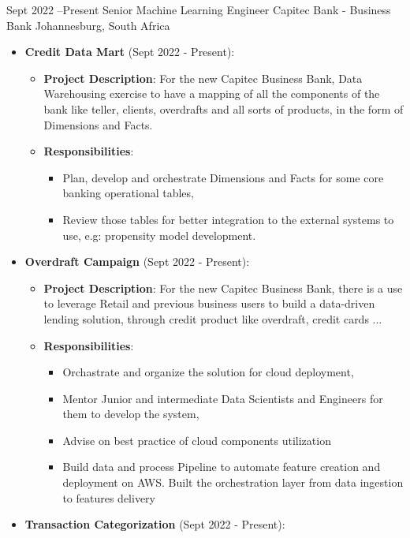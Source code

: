 \documentclass[11pt, letterpaper]{moderncv}        %
\begin{document}
\cventry
{Sept 2022 --Present}
{Senior Machine Learning Engineer}
{Capitec Bank - Business Bank}
{Johannesburg, South Africa}
{}
{
		\begin{itemize}
			\item \textbf{Credit Data Mart} (Sept 2022 - Present):  
			\begin{itemize}%
				\item \textbf{Project Description}: For the new Capitec Business Bank, Data Warehousing exercise to have a mapping of all the components of the bank like teller, clients, overdrafts and all sorts of products, in the form of Dimensions and Facts. 
			\item \textbf{Responsibilities}:
			\begin{itemize}
				\item Plan, develop and orchestrate Dimensions and Facts for some core banking operational tables,
				\item Review those tables for better integration to the external systems to use, e.g: propensity model development.
			\end{itemize}
		\end{itemize}
		\item \textbf{Overdraft Campaign} (Sept 2022 - Present):  
		\begin{itemize}%
			\item \textbf{Project Description}: For the new Capitec Business Bank, there is a use to leverage Retail and previous business users to build a data-driven lending solution, through credit product like overdraft, credit cards ...
			\item \textbf{Responsibilities}:
				\begin{itemize}
					\item Orchastrate and organize the solution for cloud deployment,
					\item Mentor Junior and intermediate Data Scientists and Engineers for them to develop the system,
					\item Advise on best practice of cloud components utilization
					\item Build data and process Pipeline to automate feature creation and deployment on AWS. Built the orchestration layer from data ingestion to features delivery
				\end{itemize}
		\end{itemize}
		\item \textbf{Transaction Categorization} (Sept 2022 - Present):  
		\begin{itemize}%

\end{itemize}
\end{itemize}}
\end{document}

